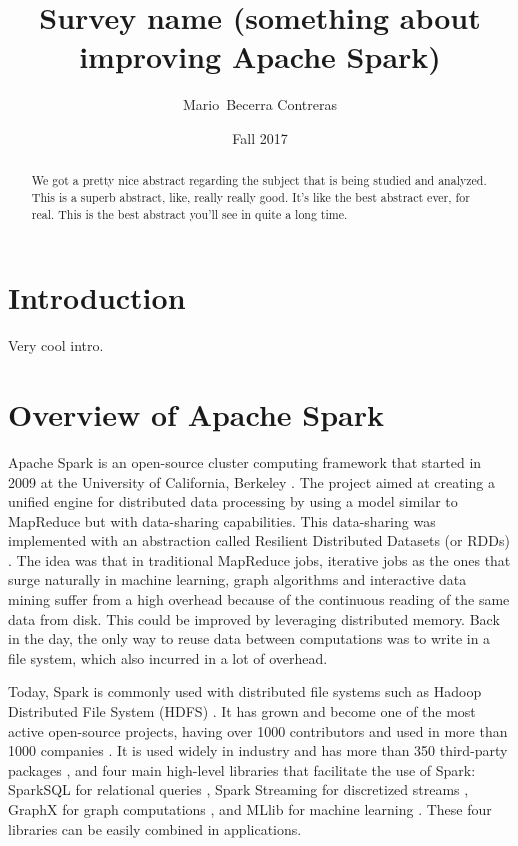 \documentclass{article}
\begin{document}

\title{Survey name (something about improving Apache Spark)}

\author{Mario~Becerra Contreras}

\date{Fall 2017}


\maketitle

\begin{abstract}

We got a pretty nice abstract regarding the subject that is being studied and analyzed. This is a superb abstract, like, really really good. It's like the best abstract ever, for real. This is the best abstract you'll see in quite a long time.

\end{abstract}

\section{Introduction}

Very cool intro.


\section{Overview of Apache Spark}

Apache Spark \cite{zaharia_spark:_2010} is an open-source cluster computing framework that started in 2009 at the University of California, Berkeley \cite{zaharia_apache_2016}. The project aimed at creating a unified engine for distributed data processing by using a model similar to MapReduce but with data-sharing capabilities. This data-sharing was implemented with an abstraction called Resilient Distributed Datasets (or RDDs) \cite{zaharia_resilient_2012}. The idea was that in traditional MapReduce jobs, iterative jobs as the ones that surge naturally in machine learning, graph algorithms and interactive data mining suffer from a high overhead because of the continuous reading of the same data from disk. This could be improved by leveraging distributed memory. Back in the day, the only way to reuse data between computations was to write in a file system, which also incurred in a lot of overhead. 

Today, Spark is commonly used with distributed file systems such as Hadoop Distributed File System (HDFS) \cite{Shvachko2010}. It has grown and become one of the most active open-source projects, having over 1000 contributors and used in more than 1000 companies \cite{zaharia_apache_2016}. It is used widely in industry and has more than 350 third-party packages \cite{SparkPackages}, and four main high-level libraries that facilitate the use of Spark: SparkSQL for relational queries \cite{armbrust2015spark}, Spark Streaming for discretized streams \cite{zaharia2013discretized}, GraphX for graph computations \cite{gonzalez2014graphx}, and MLlib for machine learning \cite{Meng2016}. These four libraries can be easily combined in applications.
\end{document}
